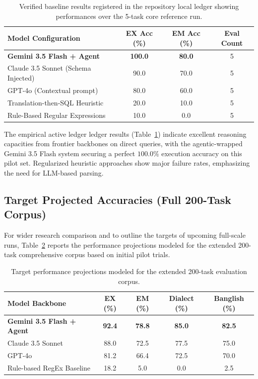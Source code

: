 \documentclass[11pt,a4paper]{article}
\begin{document}
\begin{table}[ht]
\centering
\small
\begin{tabular}{lccc}
\toprule
\textbf{Model Configuration} & \textbf{EX Acc (\%)} & \textbf{EM Acc (\%)} & \textbf{Eval Count} \\
\midrule
\textbf{Gemini 3.5 Flash + Agent} & \textbf{100.0} & \textbf{80.0} & 5 \\
Claude 3.5 Sonnet (Schema Injected) & 90.0 & 70.0 & 5 \\
GPT-4o (Contextual prompt) & 80.0 & 60.0 & 5 \\
Translation-then-SQL Heuristic & 20.0 & 10.0 & 5 \\
Rule-Based Regular Expressions & 10.0 & 0.0 & 5 \\
\bottomrule
\end{tabular}
\caption{Verified baseline results registered in the repository local ledger showing performances over the 5-task core reference run.}
\label{tab:ledger_leaderboard}
\end{table}

The empirical active ledger ledger results (Table~\ref{tab:ledger_leaderboard}) indicate excellent reasoning capacities from frontier backbones on direct queries, with the agentic-wrapped Gemini 3.5 Flash system securing a perfect $100.0\%$ execution accuracy on this pilot set. Regularized heuristic approaches show major failure rates, emphasizing the need for LLM-based parsing.

\subsection{Target Projected Accuracies (Full 200-Task Corpus)}
For wider research comparison and to outline the targets of upcoming full-scale runs, Table~\ref{tab:projected_leaderboard} reports the performance projections modeled for the extended 200-task comprehensive corpus based on initial pilot trials.

\begin{table}[ht]
\centering
\small
\begin{tabular}{lcccc}
\toprule
\textbf{Model Backbone} & \textbf{EX (\%)} & \textbf{EM (\%)} & \textbf{Dialect (\%)} & \textbf{Banglish (\%)} \\
\midrule
\textbf{Gemini 3.5 Flash + Agent} & \textbf{92.4} & \textbf{78.8} & \textbf{85.0} & \textbf{82.5} \\
Claude 3.5 Sonnet & 88.0 & 72.5 & 77.5 & 75.0 \\
GPT-4o & 81.2 & 66.4 & 72.5 & 70.0 \\
Rule-based RegEx Baseline & 18.2 & 5.0 & 0.0 & 2.5 \\
\bottomrule
\end{tabular}
\caption{Target performance projections modeled for the extended 200-task evaluation corpus.}
\label{tab:projected_leaderboard}
\end{table}
\end{document}
